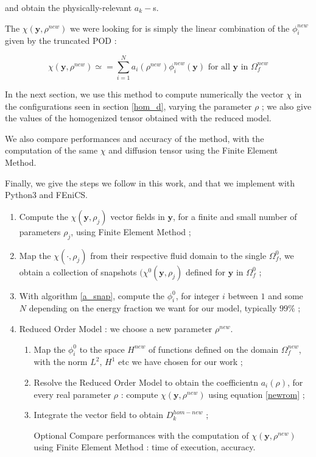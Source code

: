 and obtain the physically-relevant $a_k -$s.

\par
The $\chi(\mathbf{y},\rho^{new})$ we were looking for is simply the linear combination of the $\phi_i^{new}$ given by the truncated POD :

\begin{equation}\label{newrom}
\chi\left(\mathbf{y},\rho^{new}\right)\simeq =\sum\limits_{i=1}^N a_i \left(\rho^{new}\right)\phi_i^{new}(\mathbf{y})\text{ for all $\mathbf{y}$ in $\Omega_f^{new}$}
\end{equation}

\etoile
In the next section, we use this method to compute numerically the vector $\chi$ in the configurations seen in section \ref{hom_d}, %
varying the parameter $\rho$ ; we also give the values of the homogenized tensor obtained with the reduced model.

\par
We also compare performances and accuracy of the method, with the computation of the same $\chi$ and diffusion tensor using the Finite Element Method.

\par
Finally, we give the steps we follow in this work, and that we implement with Python3 and FEniCS.

\begin{algo}\label{a_rom}
\begin{enumerate}[label=\textbf{(S \hspace{-7pt} \Roman*)}]
\item Compute the $\chi\left(\mathbf{y},\rho_j\right)$ vector fields in $\mathbf{y}$, for a finite and small number of parameters $\rho_j$, %
using Finite Element Method ;
\item Map the $\chi (\cdot,\rho_j)$ from their respective fluid domain to the single $\Omega_f^0$, we obtain a collection of snapshots $(\chi^0(\mathbf{y},\rho_j)$ %
defined for $\mathbf{y}$ in $\Omega_f^0$ ;
\item With algorithm \ref{a_snap}, compute the $\phi^0_i$, for integer $i$ between $1$ and some $N$ depending on the energy fraction we want for our model, typically $99\%$ ;
\item Reduced Order Model : we choose a new parameter $\rho^{new}$.
\begin{enumerate}[label=(\textbf{se}\ \roman*)]
\item Map the $\phi_i^0$ to the space $H^{new}$ of functions defined on the domain $\Omega_f^{new}$, with the norm $L^2$, $H^1$ etc we have chosen for our work ;
\item Resolve the Reduced Order Model to obtain the coefficientn $a_i(\rho)$, for every real parameter $\rho$ : %
compute $\chi(\mathbf{y},\rho^{new})$ using equation \ref{newrom} ;
\item Integrate the vector field to obtain $D_k^{hom-new}$ ;
\item[Optional] Compare performances with the computation of $\chi(\mathbf{y},\rho^{new})$ using Finite Element Method : %
time of execution, accuracy.
\end{enumerate}
\end{enumerate}
\end{algo}